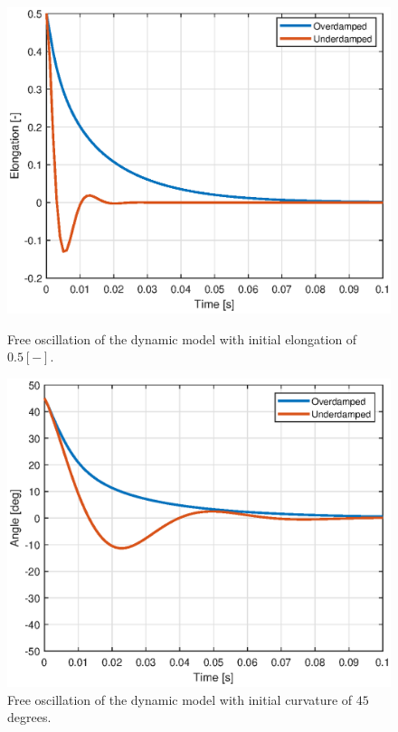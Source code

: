 \begin{figure}[H]
\begin{minipage}{0.48\textwidth}
    \centering
    \includegraphics[width = \textwidth]{Figures/Chapter5/ehighlowdamp.eps}
    \caption{Free oscillation of the dynamic model with initial elongation of $0.5 [-]$.}
    \label{fig5:esim}
    \end{minipage}
\begin{minipage}{0.48\textwidth}
    \centering
    \includegraphics[width = \textwidth]{Figures/Chapter5/khighlowdamp.eps}
    \caption{Free oscillation of the dynamic model with initial curvature of $45$ degrees.}
    \label{fig5:ksim}
    \end{minipage}
\end{figure}


